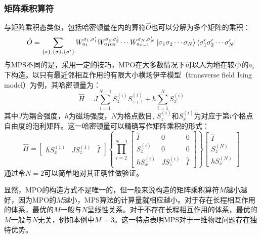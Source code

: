 \documentclass{article}
\begin{document}
\subsubsection{矩阵乘积算符}
\label{sssec: mpo}
与矩阵乘积态类似，包括哈密顿量在内的算符$\hat{O}$也可以分解为多个矩阵的乘积：
\begin{equation}
    \begin{aligned}
        \hat{O} = \sum_{\{a\},\{\sigma\},\{\sigma'\}}
         W^{\sigma_1, \sigma'_1}_{a_1} W^{\sigma_2, \sigma'_2}_{a_1a_2} \cdots
                        W^{\sigma_N, \sigma'_N}_{a_{n-1}} 
                        \ket{\sigma_1\sigma_2\cdots\sigma_N}
                        \bra{\sigma'_1\sigma'_2 \cdots \sigma'_N}
    \end{aligned}
\end{equation}
与MPS不同的是，采用一定的技巧，MPO在大多数情况下可以人为地在较小的$a_i$下构造。以只有最近邻相互作用的有限大小横场伊辛模型（transverse field Ising model）为例，其哈密顿量为：
\begin{equation}
    \hat H = J \sum_{i=1}^{N-1} S_z^{(i)} S_{z+1}^{(i)} + h \sum_{i=1}^N S_x^{(i)}
\end{equation}
其中$J$为耦合强度，$h$为磁场强度，$N$为格点数目, $S_z^{(i)}$和$S_x^{(i)}$为对应于第$i$个格点自由度的泡利矩阵。这一哈密顿量可以精确写作矩阵乘积的形式：
\begin{equation}
    \hat H = 
    \begin{bmatrix} 
     h S_x^{(1)} & J S_z^{(1)} & \hat I 
    \end{bmatrix}
    \left \{
    \prod_{i=2}^{N-1} 
    \begin{bmatrix} 
    \hat I       & 0           & 0 \\
     S_z^{(i)}   & 0          & 0 \\
     h S_x^{(i)} & J S_z^{(i)} & \hat I 
    \end{bmatrix}
    \right \}
    \begin{bmatrix} 
    \hat I       \\
     S_z^{(N)}    \\
     h S_x^{(N)} 
    \end{bmatrix}
\end{equation}
通过令$N=2$可以简单地对其正确性做验证。

显然，MPO的构造方式不是唯一的，但一般来说构造的矩阵乘积算符$M$越小越好，因为MPO的$M$越小，MPS算法的计算量就相应越小。对于存在长程相互作用的体系，最优的$M$一般与$N$呈线性关系。对于不存在长程相互作用的体系，最优的$M$一般与$N$无关，例如本例中$M=3$。这一特点表明MPS对于一维物理问题存在独特优势。
\end{document}

